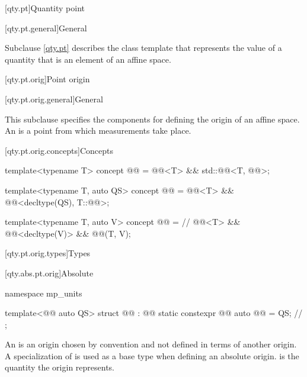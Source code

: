[qty.pt]{Quantity point}

[qty.pt.general]{General}

\pnum
Subclause \ref{qty.pt} describes the class template 
that represents the value of a quantity
that is an element of an affine space.

[qty.pt.orig]{Point origin}

[qty.pt.orig.general]{General}

\pnum
This subclause specifies the components
for defining the origin of an affine space.
An  is a point from which measurements take place.

[qty.pt.orig.concepts]{Concepts}

\begin{itemdecl}
template<typename T>
concept @@ = @@<T> && std::@@<T, @@>;

template<typename T, auto QS>
concept @@ = @@<T> && @@<decltype(QS), T::@@>;

template<typename T, auto V>
concept @@ =  // \expos
  @@<T> && @@<decltype(V)> && @@(T{}, V);
\end{itemdecl}

[qty.pt.orig.types]{Types}

[qty.abs.pt.orig]{Absolute}

\begin{codeblock}
namespace mp_units {

template<@@ auto QS>
struct @@ : @@ {
  static constexpr @@ auto @@ = QS;  // \expos
};

}
\end{codeblock}

\pnum
An  is an origin
chosen by convention and not defined in terms of another origin.
A specialization of  is used as a base type when defining an absolute origin.
 is the quantity the origin represents.

